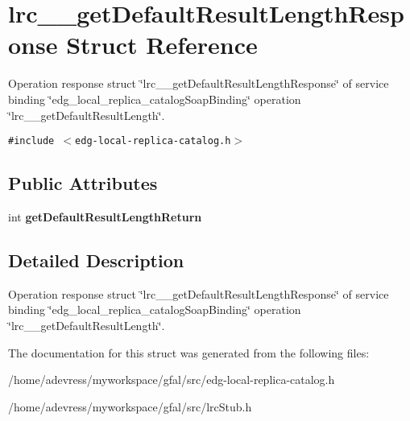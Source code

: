 \section{lrc\_\-\_\-get\-Default\-Result\-Length\-Response Struct Reference}
\label{structlrc____getDefaultResultLengthResponse}
Operation response struct \char`\"{}lrc\_\-\_\-get\-Default\-Result\-Length\-Response\char`\"{} of service binding \char`\"{}edg\_\-local\_\-replica\_\-catalog\-Soap\-Binding\char`\"{} operation \char`\"{}lrc\_\-\_\-get\-Default\-Result\-Length\char`\"{}.  


{\tt \#include $<$edg-local-replica-catalog.h$>$}

\subsection*{Public Attributes}
\begin{CompactItemize}
\item 
int \textbf{get\-Default\-Result\-Length\-Return}\label{structlrc____getDefaultResultLengthResponse_3350f2fbd529226d78336e9c9db78a46}

\end{CompactItemize}


\subsection{Detailed Description}
Operation response struct \char`\"{}lrc\_\-\_\-get\-Default\-Result\-Length\-Response\char`\"{} of service binding \char`\"{}edg\_\-local\_\-replica\_\-catalog\-Soap\-Binding\char`\"{} operation \char`\"{}lrc\_\-\_\-get\-Default\-Result\-Length\char`\"{}. 



The documentation for this struct was generated from the following files:\begin{CompactItemize}
\item 
/home/adevress/myworkspace/gfal/src/edg-local-replica-catalog.h\item 
/home/adevress/myworkspace/gfal/src/lrc\-Stub.h\end{CompactItemize}
